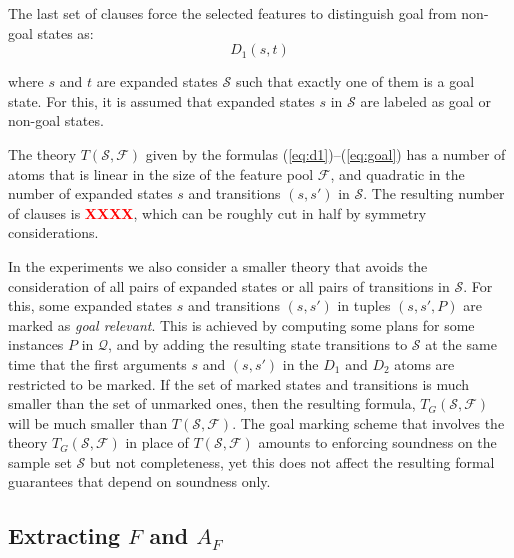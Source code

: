 \documentclass[letterpaper]{article} %
\newcommand{\Q}{\mathcal{Q}}
\newcommand{\F}{\mathcal{F}}
\renewcommand{\S}{\mathcal{S}}
\begin{document}
The last set of clauses force the selected features to distinguish goal
from non-goal states as:
\begin{equation}
  \label{eq:goal}
  D_1(s,t) 
\end{equation}

\noindent where  $s$ and $t$  are expanded states  $\S$ such that exactly one of them is a goal state. 
For this, it is assumed that expanded states $s$ in $\S$ are labeled as goal or non-goal states.

The theory $T(\S,\F)$ given by the formulas  (\ref{eq:d1})--(\ref{eq:goal})
has a number of atoms that is linear in the size of the feature pool $\F$,
and quadratic in the number of expanded  states $s$  and transitions $(s,s')$ in $\S$.
The resulting number of clauses is \textcolor{red}{\bf XXXX}, which can be
roughly cut in half by  symmetry considerations.

In the experiments we also consider a smaller theory that avoids the
consideration of all pairs of expanded states or all pairs of transitions
in $\S$. For this, some expanded states $s$ and transitions $(s,s')$ in
tuples $(s,s',P)$ are marked as \emph{goal relevant}. This is achieved by
computing some plans for some instances $P$ in $\Q$, and by adding the
resulting state transitions to $\S$ at the same time that the first
arguments $s$ and $(s,s')$ in the $D_1$ and $D_2$ atoms are restricted
to be marked.
If the set of marked states and transitions is much smaller than the set of unmarked ones, 
then the resulting formula,  $T_G(\S,\F)$ will be much smaller than $T(\S,\F)$.
The goal marking scheme that involves the theory $T_G(\S,\F)$ in place of $T(\S,\F)$
amounts to enforcing soundness on  the sample set $\S$ but not completeness, yet this does
not affect the resulting  formal guarantees that depend on soundness only. 


\subsection{Extracting $F$ and  $A_F$}
\end{document}
